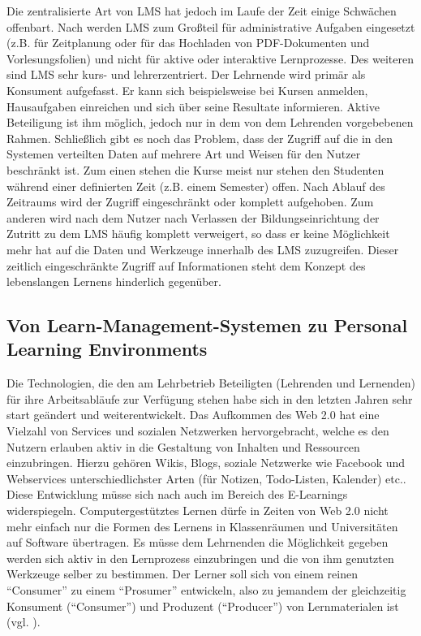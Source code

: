 Die zentralisierte Art von LMS hat jedoch im Laufe der Zeit einige Schwächen offenbart. Nach \cite{Mott2010} werden LMS zum Großteil für administrative Aufgaben eingesetzt (z.B. für Zeitplanung oder für das Hochladen von PDF-Dokumenten und Vorlesungsfolien) und nicht für aktive oder interaktive Lernprozesse. Des weiteren sind LMS sehr kurs- und lehrerzentriert. Der Lehrnende wird primär als Konsument aufgefasst. Er kann sich beispielsweise bei Kursen anmelden, Hausaufgaben einreichen und sich über seine Resultate informieren. Aktive Beteiligung ist ihm möglich, jedoch nur in dem von dem Lehrenden vorgebebenen Rahmen.
Schließlich gibt es noch das Problem, dass der Zugriff auf die in den Systemen verteilten Daten auf mehrere Art und Weisen für den Nutzer beschränkt ist. Zum einen stehen die Kurse meist nur stehen den Studenten während einer definierten Zeit (z.B. einem Semester) offen. Nach Ablauf des Zeitraums wird der Zugriff eingeschränkt oder komplett aufgehoben. Zum anderen wird nach \cite{Schaffert2008a} dem Nutzer nach Verlassen der Bildungseinrichtung der Zutritt zu dem LMS häufig komplett verweigert, so dass er keine Möglichkeit mehr hat auf die Daten und Werkzeuge innerhalb des LMS zuzugreifen. Dieser zeitlich eingeschränkte Zugriff auf Informationen steht dem Konzept des lebenslangen Lernens hinderlich gegenüber.

\subsection{Von Learn-Management-Systemen zu Personal Learning Environments}\label{section:von_lms_zu_ple}
Die Technologien, die den am Lehrbetrieb Beteiligten (Lehrenden und Lernenden) für ihre Arbeitsabläufe zur Verfügung stehen habe sich in den letzten Jahren sehr start geändert und weiterentwickelt. Das Aufkommen des Web 2.0 hat eine Vielzahl von Services und sozialen Netzwerken hervorgebracht, welche es den Nutzern erlauben aktiv in die Gestaltung von Inhalten und Ressourcen einzubringen. Hierzu gehören Wikis, Blogs, soziale Netzwerke wie Facebook und Webservices unterschiedlichster Arten (für Notizen, Todo-Listen, Kalender) etc..
Diese Entwicklung müsse sich nach \cite{Attwell2007} auch im Bereich des E-Learnings widerspiegeln. Computergestütztes Lernen dürfe in Zeiten von Web 2.0 nicht mehr einfach nur die Formen des Lernens in Klassenräumen und Universitäten auf Software übertragen. Es müsse dem Lehrnenden die Möglichkeit gegeben werden sich aktiv in den Lernprozess einzubringen und die von ihm genutzten Werkzeuge selber zu bestimmen. Der Lerner soll sich von einem reinen "`Consumer"' zu einem "`Prosumer"' entwickeln, also zu jemandem der gleichzeitig Konsument ("`Consumer"') und Produzent ("`Producer"') von Lernmaterialen ist (vgl. \cite{Schaffert2008a}).


